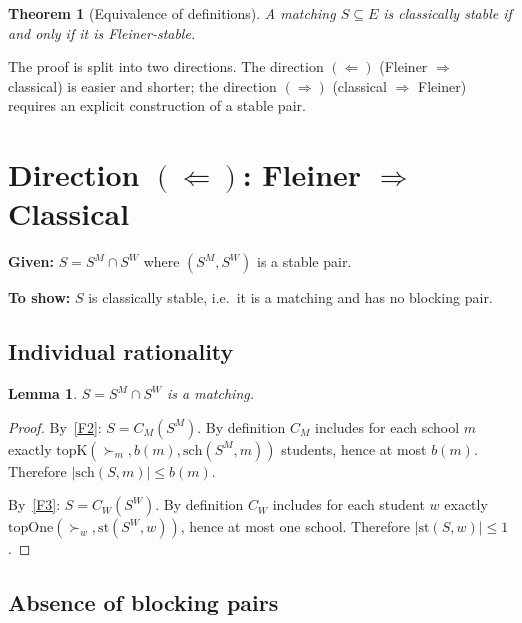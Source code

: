 \documentclass[12pt, a4paper]{article}
\theoremstyle{definition}
\theoremstyle{plain}
\newtheorem{theorem}[definition]{Theorem}
\newtheorem{lemma}[definition]{Lemma}
\theoremstyle{remark}
\newcommand{\CM}{C_M}
\newcommand{\CW}{C_W}
\newcommand{\SM}{S^M}
\newcommand{\SW}{S^W}
\newcommand{\school}[2]{\mathrm{sch}(#1,#2)}
\newcommand{\stud}[2]{\mathrm{st}(#1,#2)}
\newcommand{\topK}{\mathrm{topK}}
\newcommand{\topOne}{\mathrm{topOne}}
\newcommand{\quota}{b}
\begin{document}
\begin{theorem}[Equivalence of definitions]
\label{thm:equiv}
A matching $S \subseteq E$ is classically stable if and only if it is
Fleiner-stable.
\end{theorem}

The proof is split into two directions. The direction $(\Leftarrow)$ (Fleiner
$\Rightarrow$ classical) is easier and shorter; the direction $(\Rightarrow)$
(classical $\Rightarrow$ Fleiner) requires an explicit construction of a stable pair.

\section{Direction $(\Leftarrow)$: Fleiner $\Rightarrow$ Classical}

\textbf{Given:} $S = \SM \cap \SW$ where $(\SM, \SW)$ is a stable pair.

\textbf{To show:} $S$ is classically stable, i.e.\ it is a matching and has
no blocking pair.

\subsection{Individual rationality}

\begin{lemma}
\label{lem:ir}
$S = \SM \cap \SW$ is a matching.
\end{lemma}
\begin{proof}
By~\eqref{F2}: $S = \CM(\SM)$. By definition $\CM$ includes for each school
$m$ exactly $\topK(\succ_m, \quota(m), \school{\SM}{m})$ students, hence at
most $\quota(m)$. Therefore $|\school{S}{m}| \leq \quota(m)$.

By~\eqref{F3}: $S = \CW(\SW)$. By definition $\CW$ includes for each student
$w$ exactly $\topOne(\succ_w, \stud{\SW}{w})$, hence at most one school.
Therefore $|\stud{S}{w}| \leq 1$.
\end{proof}

\subsection{Absence of blocking pairs}
\end{document}
